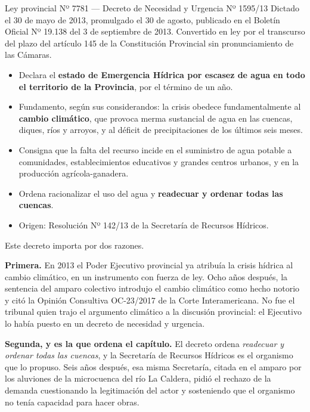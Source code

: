 \begin{ficha}{Ley provincial Nº 7781 --- Decreto de Necesidad y Urgencia Nº 1595/13}
Dictado el 30 de mayo de 2013, promulgado el 30 de agosto, publicado en el Boletín Oficial Nº 19.138 del 3 de septiembre de 2013. Convertido en ley por el transcurso del plazo del artículo 145 de la Constitución Provincial sin pronunciamiento de las Cámaras.
\begin{itemize}[leftmargin=*,nosep]
\item Declara el \textbf{estado de Emergencia Hídrica por escasez de agua en todo el territorio de la Provincia}, por el término de un año.
\item Fundamento, según sus considerandos: la crisis obedece fundamentalmente al \textbf{cambio climático}, que provoca merma sustancial de agua en las cuencas, diques, ríos y arroyos, y al déficit de precipitaciones de los últimos seis meses.
\item Consigna que la falta del recurso incide en el suministro de agua potable a comunidades, establecimientos educativos y grandes centros urbanos, y en la producción agrícola-ganadera.
\item Ordena racionalizar el uso del agua y \textbf{readecuar y ordenar todas las cuencas}.
\item Origen: Resolución Nº 142/13 de la Secretaría de Recursos Hídricos.
\end{itemize}
\end{ficha}

Este decreto importa por dos razones.

\textbf{Primera.} En 2013 el Poder Ejecutivo provincial ya atribuía la crisis hídrica al cambio climático, en un instrumento con fuerza de ley. Ocho años después, la sentencia del amparo colectivo introdujo el cambio climático como hecho notorio y citó la Opinión Consultiva OC-23/2017 de la Corte Interamericana. No fue el tribunal quien trajo el argumento climático a la discusión provincial: el Ejecutivo lo había puesto en un decreto de necesidad y urgencia.

\textbf{Segunda, y es la que ordena el capítulo.} El decreto ordena \textit{readecuar y ordenar todas las cuencas}, y la Secretaría de Recursos Hídricos es el organismo que lo propuso. Seis años después, esa misma Secretaría, citada en el amparo por los aluviones de la microcuenca del río La Caldera, pidió el rechazo de la demanda cuestionando la legitimación del actor y sosteniendo que el organismo no tenía capacidad para hacer obras.

